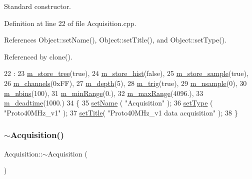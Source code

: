 Standard constructor. 



Definition at line 22 of file Acquisition.\+cpp.



References Object\+::set\+Name(), Object\+::set\+Title(), and Object\+::set\+Type().



Referenced by clone().


\begin{DoxyCode}
22                            :
23   \hyperlink{classAcquisition_aca2143e9135e25554e58327475a767c5}{m\_store\_tree}(\textcolor{keyword}{true}),
24   \hyperlink{classAcquisition_a08f70edd83751dbdab4c8190dc4b9188}{m\_store\_hist}(\textcolor{keyword}{false}),
25   \hyperlink{classAcquisition_a987cc1d04007cf1f5acc1accfd0909e5}{m\_store\_sample}(\textcolor{keyword}{true}),
26   \hyperlink{classAcquisition_aedc8b29f322ef00540797fbd0d5112d1}{m\_channels}(0xFF),
27   \hyperlink{classAcquisition_a26628424533a2dd74d24712a14637a72}{m\_depth}(5),
28   \hyperlink{classAcquisition_a953bdc1bf56206b6df33b648af32a24f}{m\_trig}(\textcolor{keyword}{true}),
29   \hyperlink{classAcquisition_a26d0f1a44309ffac49c365b7ee568ab2}{m\_nsample}(0),
30   \hyperlink{classAcquisition_a05bccdc4b9ada37beaeba8794ccef12d}{m\_nbins}(100),
31   \hyperlink{classAcquisition_a06b3ea027ebdcb15f64a6517ceb99b76}{m\_minRange}(0.),
32   \hyperlink{classAcquisition_a45478629e9db582470b4b158edb46616}{m\_maxRange}(4096.),
33   \hyperlink{classAcquisition_a5f7fe20506e7d860ed61935255adfe17}{m\_deadtime}(1000.)
34 \{
35   \hyperlink{classObject_ae30fea75683c2d149b6b6d17c09ecd0c}{setName} ( \textcolor{stringliteral}{"Acquisition"} );
36   \hyperlink{classObject_aae534cc9d982bcb9b99fd505f2e103a5}{setType} ( \textcolor{stringliteral}{"Proto40MHz\_v1"} );
37   \hyperlink{classObject_a89557dbbad5bcaa02652f5d7fa35d20f}{setTitle}( \textcolor{stringliteral}{"Proto40MHz\_v1 data acquisition"} );
38 \}
\end{DoxyCode}
\mbox{\label{classAcquisition_a3b0205ba385e2da70abb5a351c4dbf0f}} 
\subsubsection{\texorpdfstring{$\sim$\+Acquisition()}{~Acquisition()}}
{\footnotesize\ttfamily Acquisition\+::$\sim$\+Acquisition (\begin{DoxyParamCaption}{ }\end{DoxyParamCaption})\hspace{0.3cm}{\ttfamily [virtual]}}



